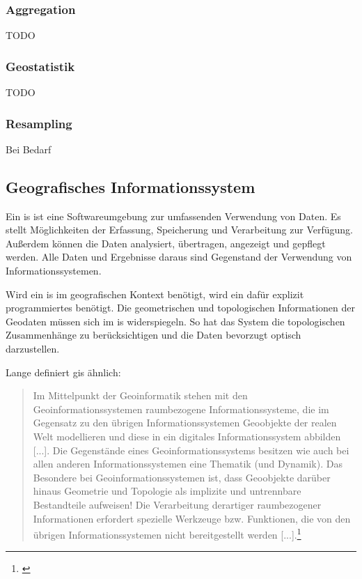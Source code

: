 \subsubsection{Aggregation}
TODO

\subsubsection{Geostatistik}
TODO

\subsubsection{Resampling}
Bei Bedarf


\subsection{Geografisches Informationssystem}
\label{grundlagen:gis}

Ein \Gls{is} ist eine Softwareumgebung zur umfassenden Verwendung von Daten.
Es stellt Möglichkeiten der Erfassung, Speicherung und Verarbeitung zur Verfügung.
Außerdem können die Daten analysiert, übertragen, angezeigt und gepflegt werden.
Alle Daten und Ergebnisse daraus sind Gegenstand der Verwendung von Informationssystemen.

Wird ein \Gls{is} im geografischen Kontext benötigt, wird ein dafür explizit programmiertes benötigt.
Die geometrischen und topologischen Informationen der Geodaten müssen sich im \Gls{is} widerspiegeln.
So hat das System die topologischen Zusammenhänge zu berücksichtigen und die Daten bevorzugt optisch  darzustellen.

Lange definiert \Gls{gis} ähnlich:
\begin{quote}
Im Mittelpunkt  der  Geoinformatik  stehen  mit den  Geoinformationssystemen raumbezogene Informationssysteme, die im Gegensatz zu den übrigen Informationssystemen Geoobjekte  der realen Welt modellieren und diese in ein digitales Informationssystem abbilden [...]. Die Gegenstände eines Geoinformationssystems  besitzen  wie  auch  bei  allen  anderen  Informationssystemen  eine 
Thematik (und Dynamik). Das Besondere bei Geoinformationssystemen ist, dass Geoobjekte darüber hinaus Geometrie und Topologie als implizite und untrennbare Bestandteile aufweisen!  Die Verarbeitung derartiger raumbezogener Informationen erfordert spezielle Werkzeuge bzw. Funktionen, die von den übrigen Informationssystemen nicht bereitgestellt werden [...].\footnote{\cite[S.337]{book:gi-theopluspraxis3}}
\end{quote}

